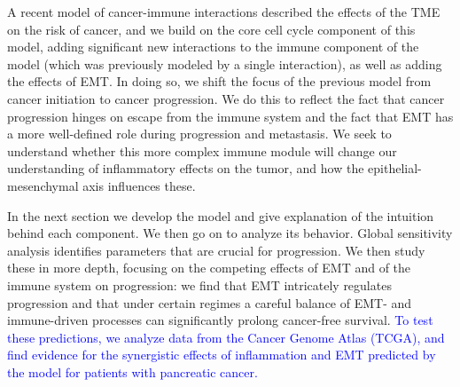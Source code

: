 \documentclass[11pt]{article}
\newcommand{\tcb} { \textcolor{blue} }
\begin{document}
A recent model of cancer-immune interactions \cite{guo17_multiscale} described the effects of the TME on the risk of cancer, and we build on the core cell cycle component of this model, adding significant new interactions to the immune component of the model (which was previously modeled by a single interaction), as well as adding the effects of EMT.
In doing so, we shift the focus of the previous model from cancer initiation to cancer progression.
We do this to reflect the fact that cancer progression hinges on escape from the immune system and the fact that EMT has a more well-defined role during progression and metastasis.
We seek to understand whether this more complex immune module will change our understanding of inflammatory effects on the tumor, and how the epithelial-mesenchymal axis influences these.
\par 
In the next section we develop the model and give explanation of the intuition behind each component.
We then go on to analyze its behavior.
Global sensitivity analysis identifies parameters that are crucial for progression.
We then study these in more depth, focusing on the competing effects of EMT and of the immune system on progression: we find that EMT intricately regulates progression and that under certain regimes a careful balance of EMT- and immune-driven processes can significantly prolong cancer-free survival.
\tcb{To test these predictions, we analyze data from the Cancer Genome Atlas (TCGA), and find evidence for the synergistic effects of inflammation and EMT predicted by the model for patients with pancreatic cancer.}

\end{document}
